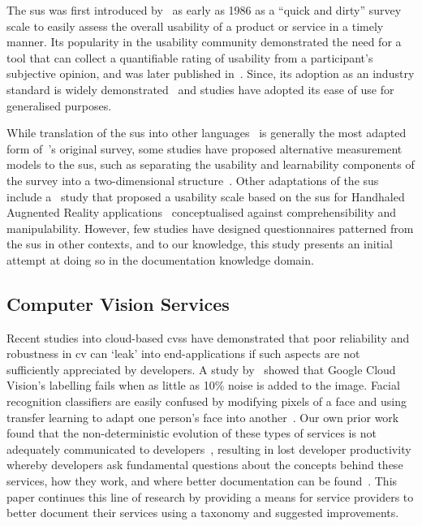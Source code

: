 The \gls{sus} was first introduced by~\citeauthor{Brooke:1996ua} as early as 1986 as a ``quick and dirty'' survey scale to easily assess the overall usability of a product or service in a timely manner. Its popularity in the usability community demonstrated the need for a tool that can collect a quantifiable rating of usability from a participant's subjective opinion, and was later published in~\citep{Brooke:1996ua}. Since, its adoption as an industry standard is widely demonstrated~\citep{Brooke:2013vt,Bangor2008} and studies have adopted its ease of use for generalised purposes.

While translation of the \gls{sus} into other languages~\citep{Martins2015,Sauro:2011aj,Borsci2009} is generally the most adapted form of~\citeauthor{Brooke:2013vt}'s original survey, some studies have proposed alternative measurement models to the \gls{sus}, such as separating the usability and learnability components of the survey into a two-dimensional structure~\citep{Borsci2009}. Other adaptations of the \gls{sus} include a~\citeyear{Santos2014} study that proposed a usability scale based on the \gls{sus} for Handhaled Augnented Reality applications~\citep{Santos2014} conceptualised against comprehensibility and manipulability. However, few studies have designed questionnaires patterned from the \gls{sus} in other contexts, and to our knowledge, this study presents an initial attempt at doing so in the  documentation knowledge domain.

\subsection{Computer Vision Services}

Recent studies into cloud-based \glspl{cvs} have demonstrated that poor reliability and robustness in \gls{cv} can `leak' into end-applications if such aspects are not sufficiently appreciated by developers. A study by~\citet{Hosseini:2018jr} showed that Google Cloud Vision's labelling fails when as little as 10\% noise is added to the image. Facial recognition classifiers are easily confused by modifying pixels of a face and using transfer learning to adapt one person's face into another~\citep{Wang:2018vl}. Our own prior work found that the non-deterministic evolution of these types of services is not adequately communicated to developers~\citep{Cummaudo:2019icsme}, resulting in lost developer productivity whereby developers ask fundamental questions about the concepts behind these services, how they work, and where better documentation can be found~\citep{Cummaudo:2020icse}. This paper continues this line of research by providing a means for service providers to better document their services using a taxonomy and suggested improvements.

